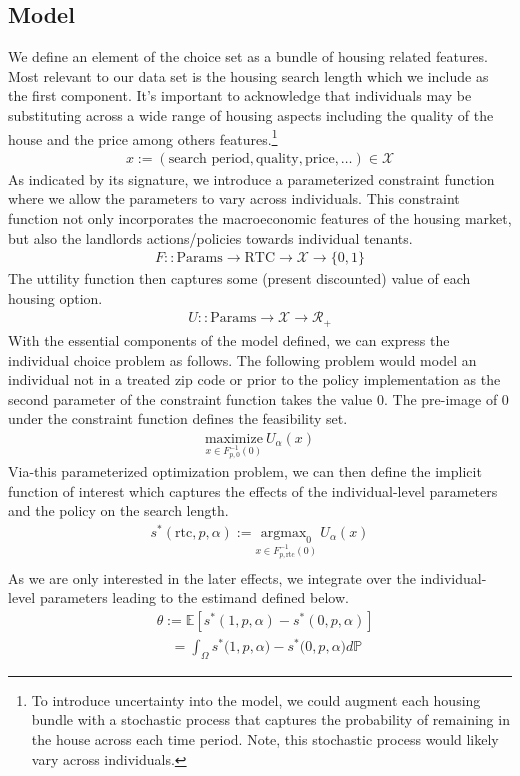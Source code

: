 \documentclass[a4paper,12pt]{article}
\begin{document}
\subsection{Model}
We define an element of the choice set as a bundle of housing related features. Most relevant to our data set is the housing search length which we include as the first component. It's important to acknowledge that individuals may be substituting across a wide range of housing aspects including the quality of the house and the price among others features.\footnote{To introduce uncertainty into the model, we could augment each housing bundle with a stochastic process that captures the probability of remaining in the house across each time period. Note, this stochastic process would likely vary across individuals.}
\begin{align*}
    x := (\textrm{search period}, \textrm{quality}, \textrm{price}, \dots ) \in \mathcal{X}
\end{align*}
As indicated by its signature, we introduce a parameterized constraint function where we allow the parameters to vary across individuals. This constraint function not only incorporates the macroeconomic features of the housing market, but also the landlords actions/policies towards individual tenants.
\begin{align*}
   F :: \textrm{Params} \to  \textrm{RTC} \to \mathcal{X} \to \{0, 1\} 
\end{align*}
The uttility function then captures some (present discounted) value of each housing option. 
\begin{align*}
U :: \textrm{Params} \to \mathcal{X} \to \mathcal{R}_+ 
\end{align*}
With the essential components of the model defined, we can express the individual choice problem as follows. The following problem would model an individual not in a treated zip code or prior to the policy implementation as the second parameter of the constraint function takes the value $0$. The pre-image of $0$ under the constraint function defines the feasibility set. 
\begin{align*}
\underset{x \in F_{p, 0}^{-1}(0)}{\textrm{maximize}} \ U_{\alpha} (x)
\end{align*}
Via-this parameterized optimization problem, we can then define the implicit function of interest which captures the effects of the individual-level parameters and the policy on the search length. 
\begin{align*}
s^*(\textrm{rtc}, p, \alpha) := \underset{x \in F_{p, \textrm{rtc}}^{-1}(0)}{\textrm{argmax}_0} \ U_{\alpha} (x) \\ 
\end{align*}
As we are only interested in the later effects, we integrate over the individual-level parameters leading to the estimand defined below.
\begin{align*}
&\theta := \mathbb{E}[s^*(1, p, \alpha) - s^*(0,  p, \alpha)] \\
&\quad = \int _{\Omega} s^*\big(1, p, \alpha\big) - s^*\big(0, p, \alpha\big)d\mathbb{P}
\end{align*}
\end{document}
